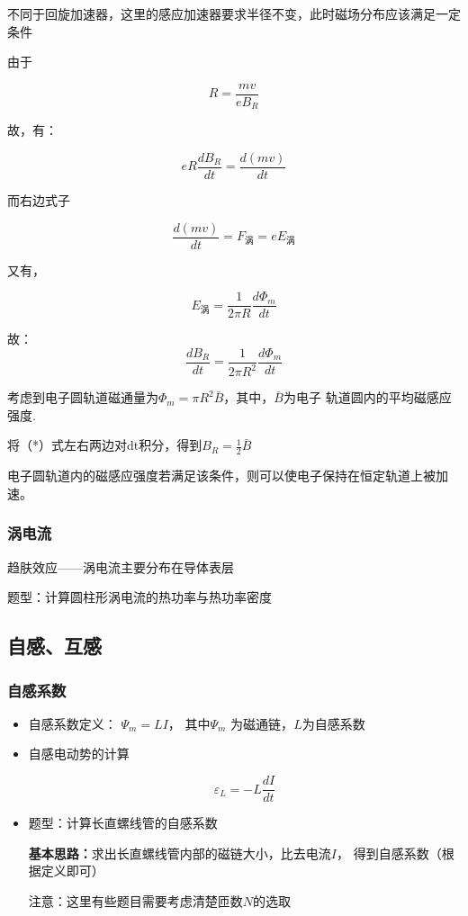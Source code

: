 \documentclass{ctexart}
\begin{document}
不同于回旋加速器，这里的感应加速器要求半径不变，此时磁场分布应该满足一定条件

由于

$$R=\frac{mv}{eB_R}$$

故，有：

$$eR\frac{dB_R}{dt}=\frac{d(mv)}{dt}$$

而右边式子

$$\frac{d(mv)}{dt}=F_{\text{涡}}=eE_{\text{涡}}$$

又有，

$$E_{\text{涡}}=\frac{1}{2\pi R}\frac{d\Phi_m}{dt}$$

故：
\begin{equation}
\frac{dB_R}{dt}=\frac{1}{2\pi R^2}\frac{d\Phi_m}{dt} \tag{*}
\end{equation}


考虑到电子圆轨道磁通量为$\Phi_m=\pi R^2\bar{B}$，其中，$\bar{B}$为电子
轨道圆内的平均磁感应强度.

将（*）式左右两边对dt积分，得到$B_R=\frac{1}{2}\bar{B}$

电子圆轨道内的磁感应强度若满足该条件，则可以使电子保持在恒定轨道上被加速。

\subsubsection{涡电流}

趋肤效应——涡电流主要分布在导体表层

题型：计算圆柱形涡电流的热功率与热功率密度

\subsection{自感、互感}
\subsubsection{自感系数}

\begin{itemize}
	\item 自感系数定义： $\Psi_m=LI$，
	其中$\Psi_m$ 为磁通链，$L$为自感系数
	
	\item 自感电动势的计算
	
	$$\varepsilon_L=-L\frac{dI}{dt}$$
	
	\item 题型：计算长直螺线管的自感系数
	
	\textbf{基本思路：}求出长直螺线管内部的磁链大小，比去电流$I$，
	得到自感系数（根据定义即可）
	
	注意：这里有些题目需要考虑清楚匝数$N$的选取
\end{itemize}
\end{document}
